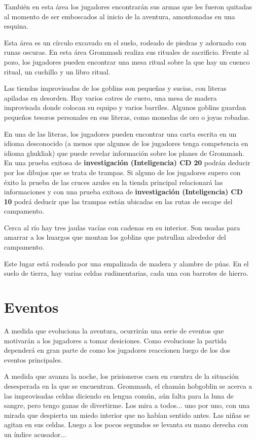 \documentclass[10pt,twoside,twocolumn,openany]{dndbook}
\begin{document}
También en esta área los jugadores encontrarán sus armas que les fueron quitadas al momento de ser
emboscados al inicio de la aventura, amontonadas en una esquina.

Esta área es un círculo excavado en el suelo, rodeado de piedras y adornado con runas oscuras. En esta 
área Grommash realiza sus rituales de sacrificio. Frente al pozo, los jugadores pueden encontrar 
una mesa ritual sobre la que hay un cuenco ritual, un cuchillo y un libro ritual.

Las tiendas improvisadas de los goblins son pequeñas y sucias, con literas apiladas en desorden. Hay 
varios catres de cuero, una mesa de madera improvisada donde colocan su equipo y varios barriles. 
Algunos goblins guardan pequeños tesoros personales en sus literas, como monedas de oro o joyas robadas.

En una de las literas, los jugadores pueden encontrar una carta escrita en un idioma desconocido 
(a menos que algunos de los jugadores tenga competencia en idioma ghukliak) que 
puede revelar información sobre los planes de Grommash. En una prueba exitosa de 
\textbf{investigación (Inteligencia) CD 20} podrán deducir por los dibujos que se trata de 
trampas. Si alguno de los jugadores supero con éxito la prueba de las cruces azules en la tienda 
principal relacionará las informaciones y con una prueba exitosa de 
\textbf{investigación (Inteligencia) CD 10} podrá deducir que las trampas están ubicadas en las
rutas de escape del campamento.

Cerca al río hay tres jaulas vacías con cadenas en su interior. Son usadas para amarrar a los 
huargos que montan los goblins que patrullan alrededor del campamento.

Este lugar está rodeado por una empalizada de madera y alambre de púas. En el suelo de tierra, hay 
varias celdas rudimentarias, cada una con barrotes de hierro. 

\section{Eventos}
A medida que evoluciona la aventura, ocurrirán una serie de eventos que motivarán a los jugadores a 
tomar desiciones. Como evolucione la partida dependerá en gran parte de como los jugadores reaccionen 
luego de los dos eventos principales.

\begin{DndReadAloud}
  A medida que avanza la noche, los prisioneros caen en cuentra de la situación desesperada en la que 
  se encuentran. Grommash, el chamán hobgoblin se acerca a las improvisadas celdas diciendo en lengua 
  común, aún falta para la luna de sangre, pero tengo ganas de divertirme. Los mira a todos... 
  uno por uno, con una mirada que despierta un miedo interior que no habían sentido antes. Las niñas 
  se agitan en sus celdas. Luego a los pocos segundos se levanta su mano derecha con un índice acusador...
\end{DndReadAloud}
\end{document}
